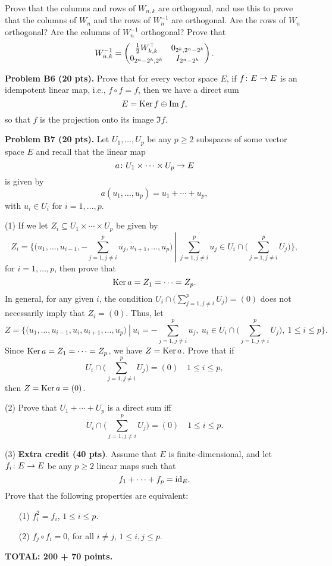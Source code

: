\documentclass[12pt]{article}
\begin{document}
\medskip
Prove that the columns and rows of $W_{n, k}$ are orthogonal, and use
this to prove that the columns of $W_n$ and the rows of
$W_n^{-1}$ are orthogonal. 
Are the rows of  $W_n$ orthogonal?
Are the columns of  $W_n^{-1}$ orthogonal?
Prove that
\[
W_{n, k}^{-1} = 
\begin{pmatrix}
 \frac{1}{2}W_{k, k}^{\top} & 0_{2^{k}, 2^{n} - 2^{k}} \\
0_{2^{n}- 2^{k}, 2^k} &  I_{2^{n} - 2^{k}}
\end{pmatrix}.
\]


\vspace {0.25cm}\noindent
{\bf Problem B6 (20 pts).}
Prove that 
for every vector space $E$, if $f\colon E\rightarrow E$ is an idempotent
linear map, i.e., $f\circ f = f$, then we have a direct sum
\[
E = {\rm Ker}\,{f} \oplus {\rm Im}\,{f},
\]
so that $f$ is the projection onto its image $\Im{f}$.


\vspace {0.25cm}\noindent
{\bf Problem B7 (20 pts).}
Let $U_1, \ldots, U_p$ be any  $p \geq 2$  subspaces of some vector
space $E$ and recall that the linear map
\[
a\colon U_1\times \cdots \times U_p\rightarrow E
\]
is given by
\[
a(u_1, \ldots, u_p) = u_1 + \cdots + u_p,
\]
with $u_i \in U_i$ for $i = 1, \ldots, p$.

\medskip
(1)
If we let $Z_i \subseteq U_1\times \cdots \times U_p$ be given by
\[
Z_i = \left.\bigg\{\Big(u_1, \ldots, u_{i - 1}, -\sum_{j = 1, j \not= i}^p u_j, u_{i + 1}, 
\ldots, u_p\Big) \>\right|\> \sum_{j = 1, j \not= i}^p u_j  \in  
U_i \cap \bigg(\sum_{j = 1, j \not= i}^p U_j \bigg) 
\bigg\},
\]
for $i = 1, \ldots, p$, then prove that
\[
{\rm Ker}\,{a} = Z_1 = \cdots =   Z_p.
\]
In general, for any given $i$, the condition
$U_i \cap \bigg(\sum_{j = 1, j \not= i}^p U_j \bigg) =
(0)$ does not necessarily imply that $Z_i = (0)$.
Thus, let 
\[
Z = \left.\bigg\{\Big(u_1, \ldots, u_{i - 1}, u_i, u_{i + 1}, 
\ldots, u_p\Big) \>\right|\> u_i =  -\sum_{j = 1, j \not= i}^p u_j, \>
u_i   \in  
U_i \cap \bigg(\sum_{j = 1, j \not= i}^p U_j \bigg), \> 1\leq i \leq p 
\bigg\}.
\]
Since ${\rm Ker}\,{a} = Z_1 = \cdots =  Z_p$, we have $Z = {\rm Ker}\, a$.
Prove that if
\[
U_i \cap \bigg(\sum_{j = 1, j \not= i}^p U_j \bigg) = (0)
\quad 1 \leq i \leq p,
\]
then $Z = {\rm Ker}\, a = (0)$.

\medskip
(2)
Prove that $U_1 + \cdots + U_p$ is a direct sum iff
\[
U_i \cap \bigg(\sum_{j = 1, j \not= i}^p U_j \bigg) = (0)
\quad 1 \leq i \leq p.
\]


\medskip\noindent
(3)
{\bf Extra credit (40 pts)\/}.
Assume that $E$ is finite-dimensional, and
let $f_i\colon E\rightarrow E$ be any 
$p\geq 2$ linear maps such that
\[
f_1 + \cdots + f_p  = {\rm id}_E.
\]
Prove that the following properties are equivalent:
\begin{enumerate}
\item[(1)]
$f_i^2 = f_i$, $1\leq i \leq p$.
\item[(2)]
$f_j \circ f_i =  0$, for all $i \not= j$, $1\leq i, j \leq p$.
\end{enumerate}


\vspace{0.5cm}\noindent
{\bf TOTAL: 200  + 70 points.}
\end{document}
